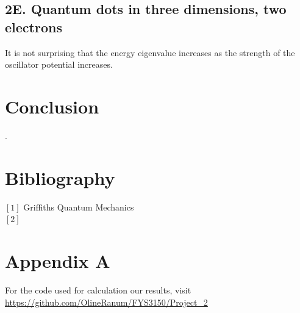 \documentclass[%
reprint,
amsmath,amssymb,
aps,
]{revtex4-1}
\begin{document}
\subsection*{2E. Quantum dots in three dimensions, two electrons} \noindent 
It is not surprising that the energy eigenvalue increases as the strength of the oscillator potential increases. 


\section*{Conclusion}


\newpage .
\newpage 
\onecolumngrid
\section*{Bibliography}
\noindent $[1]$ Griffiths Quantum Mechanics\\ 
$[2]$
\section*{Appendix A}
For the code used for calculation our results, visit
\url{https://github.com/OlineRanum/FYS3150/Project_2}
\end{document}
